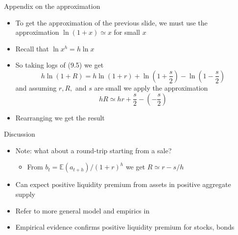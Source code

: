 \documentclass[english,10pt
,aspectratio=169
]{beamer}
\begin{document}
\begin{frame}{Appendix on the approximation}
	\begin{itemize}
		\item To get the approximation of the previous slide, we must use the approximation $\ln (1+x) \simeq x$ for small $x$
		\item Recall that $\ln x^h = h \ln x$
		\item So taking logs of (9.5) we get
		\[
		h \ln (1+R) = h\ln (1+r) + \ln(1+\frac{s}{2}) - \ln(1-\frac{s}{2}) 
		\]
		and assuming $r, R,$ and $s$ are small we apply the approximation
		\[
		hR \simeq hr+\frac{s}{2}- \left(-\frac{s}{2}\right)
		\]
		\item Rearranging we get the result
	\end{itemize}
\end{frame}


\begin{frame}{Discussion}
	\begin{itemize}
		\item Note: what about a round-trip starting from a sale?
		\begin{itemize}
			\item From $b_t=\mathbb{E}(a_{t+h})/(1+r)^h$ we get $R \simeq r-s/h$
		\end{itemize}
		\pause
		\pause[4]
		\item Can expect positive liquidity premium from assets in positive aggregate supply
		\item Refer to more general model and empirics in \citet*{bongaerts_derivative_2011}
		\item Empirical evidence confirms positive liquidity premium for stocks, bonds
	\end{itemize}
\end{frame}
\end{document}
